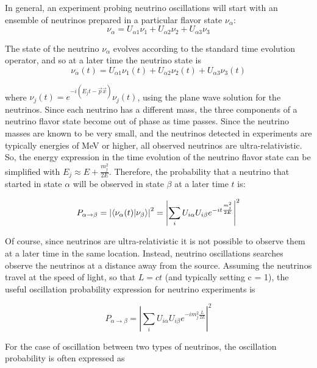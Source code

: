 In general, an experiment probing neutrino oscillations will start with an ensemble of neutrinos prepared in a particular flavor state $\nu_\alpha$:
\begin{equation*}
\nu_\alpha = U_{\alpha 1} \nu_1 + U_{\alpha 2} \nu_2 + U_{\alpha 3} \nu_3
\end{equation*}

The state of the neutrino $\nu_\alpha$ evolves according to the standard time evolution operator, and so at a later time the neutrino state is  
\begin{equation*}
\nu_\alpha (t) = U_{\alpha 1} \nu_1(t) + U_{\alpha 2} \nu_2(t) + U_{\alpha 3} \nu_3(t)
\end{equation*}

where $\nu_{j}(t) = e^{-i ( E_j t - \vec{p} \dot \vec{x})} \nu_j (t)$, using the plane wave solution for the neutrinos.  Since each neutrino has a different mass, the three components of a neutrino flavor state become out of phase as time passes.  Since the neutrino masses are known to be very small, and the neutrinos detected in experiments are typically energies of MeV or higher, all observed neutrinos are ultra-relativistic.  So, the energy expression in the time evolution of the neutrino flavor state can be simplified with $E_j \approx E + \frac{m_j^2}{2E}$.  Therefore, the probability that a neutrino that started in state $\alpha$ will be observed in state $\beta$ at a later time $t$ is:

\begin{equation*}
P_{\alpha\rightarrow\beta} = \left|\braket{\nu_\alpha(t) | \nu_\beta}\right|^2 = \left|\sum_i U_{i\alpha} U_{i\beta} e^{-i t \frac{m_j^2 }{ 2 E}}\right|^2
\end{equation*}

Of course, since neutrinos are ultra-relativistic it is not possible to observe them at a later time in the same location.  Instead, neutrino oscillations searches observe the neutrinos at a distance away from the source.  Assuming the neutrinos travel at the speed of light, so that $L = c t$ (and typically setting c = 1), the useful oscillation probability expression for neutrino experiments is 

\begin{equation*}
P_{\alpha\rightarrow\beta} = \left|\sum_i U_{i\alpha} U_{i\beta} e^{-i m_j^2 \frac{L}{2E}}\right|^2
\end{equation*}

For the case of oscillation between two types of neutrinos, the oscillation probability is often expressed as

